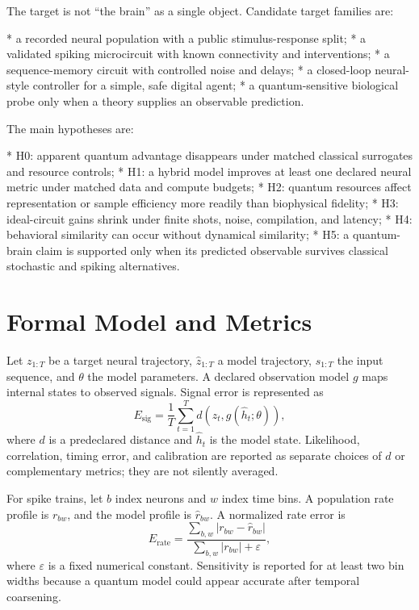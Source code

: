 \documentclass[conference]{IEEEtran}
\begin{document}
The target is not ``the brain'' as a single object. Candidate target families are:

* a recorded neural population with a public stimulus-response split;
* a validated spiking microcircuit with known connectivity and interventions;
* a sequence-memory circuit with controlled noise and delays;
* a closed-loop neural-style controller for a simple, safe digital agent;
* a quantum-sensitive biological probe only when a theory supplies an observable
  prediction.

The main hypotheses are:

* H0: apparent quantum advantage disappears under matched classical surrogates and
  resource controls;
* H1: a hybrid model improves at least one declared neural metric under matched data and
  compute budgets;
* H2: quantum resources affect representation or sample efficiency more readily than
  biophysical fidelity;
* H3: ideal-circuit gains shrink under finite shots, noise, compilation, and latency;
* H4: behavioral similarity can occur without dynamical similarity;
* H5: a quantum-brain claim is supported only when its predicted observable survives
  classical stochastic and spiking alternatives.

\section{Formal Model and Metrics}
\label{sec:formal}

Let $z_{1:T}$ be a target neural trajectory, $\hat{z}_{1:T}$ a model trajectory,
$s_{1:T}$ the input sequence, and $\theta$ the model parameters. A declared observation
model $g$ maps internal states to observed signals. Signal error is represented as
\begin{equation}
E_{\mathrm{sig}}=\frac{1}{T}\sum_{t=1}^{T}d\left(z_t,g(\hat{h}_t;\theta)\right),
\label{eq:signal}
\end{equation}
where $d$ is a predeclared distance and $\hat{h}_t$ is the model state. Likelihood,
correlation, timing error, and calibration are reported as separate choices of $d$ or
complementary metrics; they are not silently averaged.

For spike trains, let $b$ index neurons and $w$ index time bins. A population rate
profile is $r_{bw}$, and the model profile is $\hat{r}_{bw}$. A normalized rate error is
\begin{equation}
E_{\mathrm{rate}}=\frac{\sum_{b,w}|r_{bw}-\hat{r}_{bw}|}{\sum_{b,w}|r_{bw}|+\varepsilon},
\label{eq:rate}
\end{equation}
where $\varepsilon$ is a fixed numerical constant. Sensitivity is reported for at
least two bin widths because a quantum model could appear accurate after temporal
coarsening.
\end{document}
